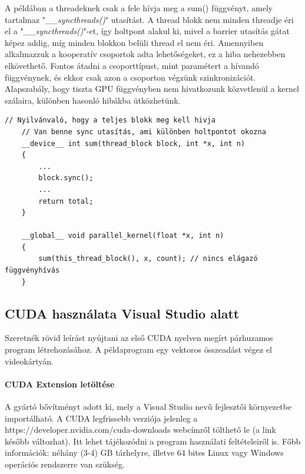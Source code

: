 A példában a threadeknek csak a fele hívja meg a sum() függvényt, amely tartalmaz "\textit{\_\_syncthreads()}" utasítást. A thread blokk nem minden threadje éri el a "\textit{\_\_syncthreads()}"-et, így holtpont alakul ki, mivel a barrier utasítás gátat képez addig, míg minden blokkon belüli thread el nem éri.
Amennyiben alkalmazzuk a kooperatív csoportok adta lehetőségeket, ez a hiba nehezebben elkövethető. Fontos átadni a csoporttípust, mint paramétert a hívandó függvénynek, és ekkor csak azon a csoporton végzünk szinkronizációt. Alapszabály, hogy tiszta GPU függvényben nem hivatkozunk közvetlenül a kernel szálaira, különben hasonló hibákba ütközhetünk.
\begin{lstlisting}[style=CStyle]
	// Nyilvánvaló, hogy a teljes blokk meg kell hivja
	// Van benne sync utasítás, ami különben holtpontot okozna
	__device__ int sum(thread_block block, int *x, int n) 
	{
		...
		block.sync();
		...
		return total;
	}
	
	__global__ void parallel_kernel(float *x, int n)
	{
		sum(this_thread_block(), x, count); // nincs elágazó függvényhívás
	}
\end{lstlisting}


\subsection{CUDA használata Visual Studio alatt}

Szeretnék rövid leírást nyújtani az első CUDA nyelven megírt párhuzamos program létrehozásához. A példaprogram egy vektoros összeadást végez el videokártyán.

\paragraph{CUDA Extension letöltése}
A gyártó bővítményt adott ki, mely a Visual Studio nevű fejlesztői környezetbe importálható. A CUDA legfrissebb verziója jelenleg a https://developer.nvidia.com/cuda-downloads webcímről tölthető le (a link később változhat). Itt lehet tájékozódni a program használati feltételeiről is. Főbb információk: néhány (3-4) GB tárhelyre, illetve 64 bites Linux vagy Windows operációs rendszerre van szükség.

